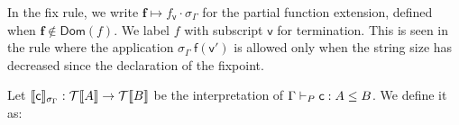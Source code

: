 In the fix rule, we write $\mathbf{f} \mapsto f_{\mathsf{v}} \cdot \sigma_{\Gamma}$ for the partial function extension, defined when $\mathbf{f} \notin \mathsf{Dom}(f)$. We label $f$ with subscript $\mathsf{v}$ for termination. This is seen in the rule where the application $\sigma_{\Gamma}~\mathsf{f}(\mathsf{v'})$ is allowed only when the string size has decreased since the declaration of the fixpoint.
\begin{definition}[Interpretation]
Let $\llbracket \mathsf{c} \rrbracket_{\sigma_{\Gamma}} : \mathcal{T}\llbracket A \rrbracket \rightarrow \mathcal{T}\llbracket B \rrbracket$ be the interpretation of $\Gamma \vdash_P \mathsf{c} : A \leq B$. We define it as:   
  \begin{displaymath}
    \begin{array}{l}

\end{array}
\end{displaymath}
\end{definition}
